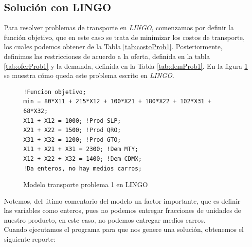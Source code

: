 \documentclass[12pt]{article}  %
\begin{document}
\subsection{Solución con LINGO}
Para resolver problemas de transporte en \textit{LINGO}, comenzamos por definir la función objetivo, que en este caso se trata de minimizar los costos de transporte, los cuales podemos obtener de la Tabla \ref{tab:costoProb1}.
Posteriormente, definimos las restricciones de acuerdo a la oferta, definida en la tabla \ref{tab:oferProb1} y la demanda, definida en la Tabla \ref{tab:demProb1}.
En la figura \ref{fig:lingoProb1} se muestra cómo queda este problema escrito en \textit{LINGO}.

\begin{figure}[H]
	\centering
	\caption{Modelo transporte problema 1 en LINGO}
	\label{fig:lingoProb1}
	\begin{verbatim}
!Funcion objetivo;
min = 80*X11 + 215*X12 + 100*X21 + 180*X22 + 102*X31 + 68*X32;
X11 + X12 = 1000; !Prod SLP;
X21 + X22 = 1500; !Prod QRO;
X31 + X32 = 1200; !Prod GTO;
X11 + X21 + X31 = 2300; !Dem MTY;
X12 + X22 + X32 = 1400; !Dem CDMX;
!Da enteros, no hay medios carros;
	\end{verbatim}
\end{figure}

Notemos, del útimo comentario del modelo un factor importante, que es definir las variables como enteros, pues no podemos entregar fracciones de unidades de nuestro producto, en este caso, no podemos entregar medios carros.\\
Cuando ejecutamos el programa para que nos genere una solución, obtenemos el siguiente reporte:
\end{document}
